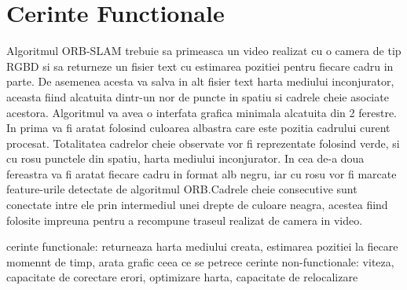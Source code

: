 \documentclass[12pt,a4paper]{report}
\begin{document}
\section{Cerinte Functionale}
Algoritmul ORB-SLAM trebuie sa primeasca un video realizat cu o camera de tip RGBD si sa 
returneze un fisier text cu estimarea pozitiei pentru fiecare cadru in parte. De asemenea
acesta va salva in alt fisier text harta mediului inconjurator, aceasta fiind alcatuita 
dintr-un nor de puncte in spatiu si cadrele cheie asociate acestora. Algoritmul va avea 
o interfata grafica minimala alcatuita din 2 ferestre. In prima va fi aratat folosind 
culoarea albastra care este pozitia cadrului curent procesat. Totalitatea 
cadrelor cheie observate vor fi reprezentate folosind verde, si cu rosu punctele din 
spatiu, harta mediului inconjurator. In cea de-a doua fereastra va fi aratat fiecare 
cadru in format alb negru, iar cu rosu vor fi marcate feature-urile detectate de 
algoritmul ORB.\@ Cadrele cheie consecutive sunt conectate intre ele prin intermediul
unei drepte de culoare neagra, acestea fiind folosite impreuna pentru a recompune 
traseul realizat de camera in video.             


cerinte functionale: returneaza harta mediului creata, estimarea pozitiei la fiecare 
momennt de timp, arata grafic ceea ce se petrece   
cerinte non-functionale: viteza, capacitate de corectare erori, optimizare harta, capacitate
de relocalizare  
\end{document}
